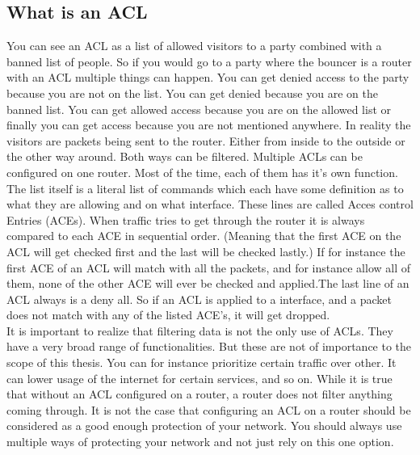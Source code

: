 \subsection{What is an ACL}
You can see an ACL as a list of allowed visitors to a party combined with a banned list of people. So if you would go to a party where the bouncer is a router with an ACL multiple things can happen. You can get denied access to the party because you are not on the list. You can get denied because you are on the banned list. You can get allowed access because you are on the allowed list or finally you can get access because you are not mentioned anywhere.
In reality the visitors are packets being sent to the router. Either from inside to the outside or the other way around. Both ways can be filtered. Multiple ACLs can be configured on one router. Most of the time, each of them has it's own function. The list itself is a literal list of commands which each have some definition as to what they are allowing and on what interface. These lines are called Acces control Entries (ACEs). When traffic tries to get through the router it is always compared to each ACE in sequential order. (Meaning that the first ACE on the ACL will get checked first and the last will be checked lastly.) If for instance the first ACE of an ACL will match with all the packets, and for instance allow all of them, none of the other ACE will ever be checked and applied.The last line of an ACL always is a deny all. So if an ACL is applied to a interface, and a packet does not match with any of the listed ACE's, it will get dropped. \\
It is important to realize that filtering data is not the only use of ACLs. They have a very broad range of functionalities. But these are not of importance to the scope of this thesis. You can for instance prioritize certain traffic over other. It can lower usage of the internet for certain services, and so on.
While it is true that without an ACL configured on a router, a router does not filter anything coming through. It is not the case that configuring an ACL on a router should be considered as a good enough protection of your network. You should always use multiple ways of protecting your network and not just rely on this one option.
